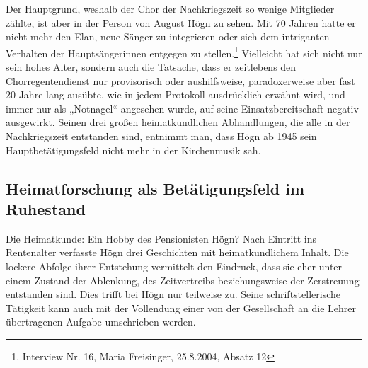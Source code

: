 \documentclass[a4paper]{article}
\begin{document}
Der Hauptgrund, weshalb der Chor der Nachkriegszeit so wenige Mitglieder
zählte, ist aber in der Person von August Högn zu sehen. Mit 70 Jahren
hatte er nicht mehr den Elan, neue Sänger zu integrieren oder sich dem
intriganten Verhalten der Hauptsängerinnen entgegen zu
stellen.\footnote{ Interview Nr. 16, Maria Freisinger, 25.8.2004,
Absatz 12} Vielleicht hat sich nicht nur sein hohes Alter, sondern auch
die Tatsache, dass er zeitlebens den Chorregentendienst nur
provisorisch oder aushilfsweise, paradoxerweise aber fast 20 Jahre lang
ausübte, wie in jedem Protokoll ausdrücklich erwähnt wird, und immer
nur als „Notnagel“ angesehen wurde, auf seine Einsatzbereitschaft
negativ ausgewirkt. Seinen drei großen heimatkundlichen Abhandlungen,
die alle in der Nachkriegszeit entstanden sind, entnimmt man, dass Högn
ab 1945 sein Hauptbetätigungsfeld nicht mehr in der Kirchenmusik sah.

\subsection{Heimatforschung als Betätigungsfeld im Ruhestand}
\hypertarget{RefHeadingToc100333736}{}Die Heimatkunde: Ein Hobby des
Pensionisten Högn? Nach Eintritt ins Rentenalter verfasste Högn drei
Geschichten mit heimatkundlichem Inhalt. Die lockere Abfolge ihrer
Entstehung vermittelt den Eindruck, dass sie eher unter einem Zustand
der Ablenkung, des Zeitvertreibs beziehungsweise der Zerstreuung
entstanden sind. Dies trifft bei Högn nur teilweise zu. Seine
schriftstellerische Tätigkeit kann auch mit der Vollendung einer von
der Gesellschaft an die Lehrer übertragenen Aufgabe umschrieben werden.
\end{document}
